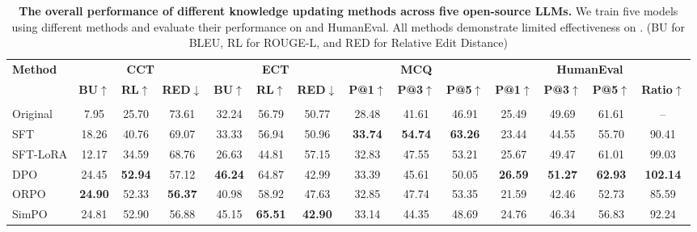 \begin{table*}[!t]
\small
\setlength{\tabcolsep}{5.4pt} 
\begin{minipage}[t]{\linewidth}
    \caption{\textbf{The overall performance of different knowledge updating methods across five open-source LLMs.} We train five models using different methods and evaluate their performance on \benchmark and HumanEval. All methods demonstrate limited effectiveness on \benchmark. (BU for BLEU, RL for ROUGE-L, and RED for Relative Edit Distance)}
    \centering
    \begin{tabular}{l|ccc|ccc|ccc|cccc}
        \toprule
        \multirow{2}{*}{\textbf{Method}} & \multicolumn{3}{c|}{\textbf{CCT}} & \multicolumn{3}{c|}{\textbf{ECT}} & \multicolumn{3}{c|}{\textbf{MCQ}}  & \multicolumn{4}{c}{\textbf{HumanEval}} \\
         & \textbf{BU}$\uparrow$ & \textbf{RL}$\uparrow$ & \textbf{RED}$\downarrow$ & \textbf{BU}$\uparrow$ & \textbf{RL}$\uparrow$ & \textbf{RED}$\downarrow$ & \textbf{P@1}$\uparrow$ & \textbf{P@3}$\uparrow$ & \textbf{P@5}$\uparrow$ & \textbf{P@1}$\uparrow$ & \textbf{P@3}$\uparrow$ & \textbf{P@5}$\uparrow$ & \textbf{Ratio}$\uparrow$\\
        \midrule
        \multicolumn{13}{c}{\text{\textit{Qwen2.5-7B-Instruct}}}\\
        \hline
        Original & 7.95 & 25.70 & 73.61 & 32.24 & 56.79 & 50.77 & 28.48 & 41.61 & 46.91 & 25.49 & 49.69 & 61.61 & --\\
        SFT & 18.26 & 40.76 & 69.07 & 33.33 & 56.94 & 50.96 & \cellcolor{lightblue}\textbf{33.74} & \cellcolor{lightblue}\textbf{54.74} & \cellcolor{lightblue}\textbf{63.26} & 23.44 & 44.55 & 55.70 & 90.41\\
        SFT-LoRA & 12.17 & 34.59 & 68.76 & 26.63 & 44.81 & 57.15 & 32.83 & 47.55 & 53.21 & 25.67 & 49.47 & 61.01 & 99.03\\
        DPO & 24.45 & \cellcolor{lightblue}\textbf{52.94} & 57.12 & \cellcolor{lightblue}\textbf{46.24} & 64.87 & 42.99 & 33.39 & 45.61 & 50.05 & \cellcolor{lightblue}\textbf{26.59} & \cellcolor{lightblue}\textbf{51.27} & \cellcolor{lightblue}\textbf{62.93} & \cellcolor{lightblue}\textbf{102.14}\\
        ORPO & \cellcolor{lightblue}\textbf{24.90} & 52.33 & \cellcolor{lightblue}\textbf{56.37} & 40.98 & 58.92 & 47.63 & 32.85 & 47.74 & 53.35 & 21.59 & 42.46 & 52.73 & 85.59\\
        SimPO & 24.81 & 52.90 & 56.88 & 45.15 & \cellcolor{lightblue}\textbf{65.51} & \cellcolor{lightblue}\textbf{42.90} & 33.14 & 44.35 & 48.69 & 24.76 & 46.34 & 56.83 & 92.24\\

\end{tabular}
\end{minipage}
\end{table*}
